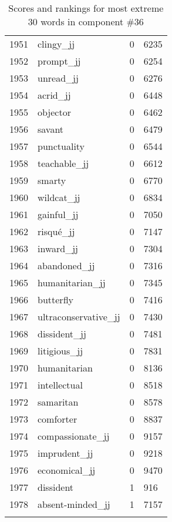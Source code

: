 \begin{longtable}[!htbp]{| rlr@{.}l |}
    1951 & clingy\_jj & 0 & 6235 \\
    1952 & prompt\_jj & 0 & 6254 \\
    1953 & unread\_jj & 0 & 6276 \\
    1954 & acrid\_jj & 0 & 6448 \\
    1955 & objector & 0 & 6462 \\
    1956 & savant & 0 & 6479 \\
    1957 & punctuality & 0 & 6544 \\
    1958 & teachable\_jj & 0 & 6612 \\
    1959 & smarty & 0 & 6770 \\
    1960 & wildcat\_jj & 0 & 6834 \\
    1961 & gainful\_jj & 0 & 7050 \\
    1962 & risqué\_jj & 0 & 7147 \\
    1963 & inward\_jj & 0 & 7304 \\
    1964 & abandoned\_jj & 0 & 7316 \\
    1965 & humanitarian\_jj & 0 & 7345 \\
    1966 & butterfly & 0 & 7416 \\
    1967 & ultraconservative\_jj & 0 & 7430 \\
    1968 & dissident\_jj & 0 & 7481 \\
    1969 & litigious\_jj & 0 & 7831 \\
    1970 & humanitarian & 0 & 8136 \\
    1971 & intellectual & 0 & 8518 \\
    1972 & samaritan & 0 & 8578 \\
    1973 & comforter & 0 & 8837 \\
    1974 & compassionate\_jj & 0 & 9157 \\
    1975 & imprudent\_jj & 0 & 9218 \\
    1976 & economical\_jj & 0 & 9470 \\
    1977 & dissident & 1 & 916 \\
    1978 & absent-minded\_jj & 1 & 7157 \\
    \hline
    \caption{Scores and rankings for most extreme 30 words in component \#36} \\
\end{longtable}
